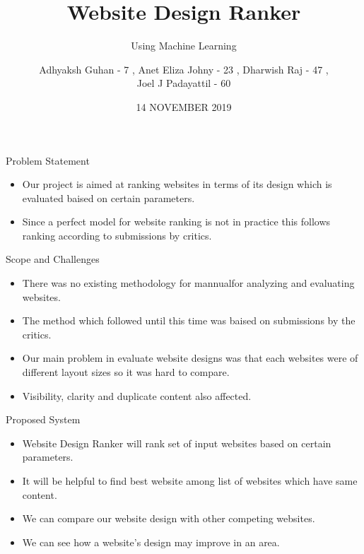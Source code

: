 \documentclass[11pt]{beamer}
\begin{document}
	\title{\textbf{Website Design Ranker}}
	\subtitle{Using Machine Learning}
	\date{14 NOVEMBER 2019}
	\author{{\scriptsize Adhyaksh Guhan - 7 , Anet Eliza Johny - 23 , Dharwish Raj - 47 , \\ Joel J Padayattil - 60}}
	\begin{frame}[plain]
		\maketitle
	\end{frame}
	\begin{frame}{Problem Statement}
		\begin{itemize}
			
			
			\item Our project is aimed at ranking websites in terms of its design which is evaluated baised on certain parameters.
			
			\item Since a perfect model for website ranking  is not in practice this  follows ranking according to submissions by critics.
			
		\end{itemize}
	\end{frame}
	\begin{frame}{Scope and Challenges}
		\begin{itemize}
			
			\item There was no existing methodology for mannualfor analyzing and evaluating websites.
			
			\item The method which followed until this time was baised on submissions by the critics.
			
			\item Our main problem in evaluate website designs was that each websites were of different layout sizes so it was hard to compare.
			
			\item Visibility, clarity and duplicate content also affected.
			
	
			
		\end{itemize}
	\end{frame}
	\begin{frame}{Proposed System}
			\begin{itemize}
			\item Website Design Ranker will rank set of input websites based on certain parameters.
			\item It will be helpful to find best website among list of websites which have same content.
			\item We can compare our website design with other competing websites.
			\item We can see how a website's design may improve in an area.

			\end{itemize}
	\end{frame}
\end{document}
